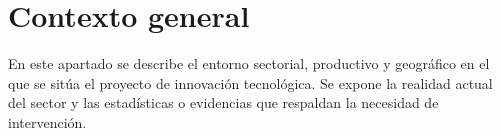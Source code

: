 \section{Contexto general}
\label{sec:contexto_general}

En este apartado se describe el entorno sectorial, productivo y geográfico en el que se sitúa el proyecto de innovación tecnológica. Se expone la realidad actual del sector y las estadísticas o evidencias que respaldan la necesidad de intervención.
